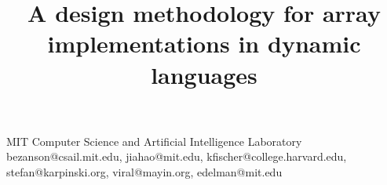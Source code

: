 \documentclass[preprint]{sigplanconf}
\begin{document}
\setlength{\pdfpageheight}{\paperheight}
\setlength{\pdfpagewidth}{\paperwidth}




\permissiontopublish             %



\title{ A design methodology for array implementations in dynamic languages }

           {MIT Computer Science and Artificial Intelligence Laboratory}
  { bezanson@csail.mit.edu, jiahao@mit.edu, kfischer@college.harvard.edu, stefan@karpinski.org, viral@mayin.org, edelman@mit.edu }


\maketitle
\end{document}
